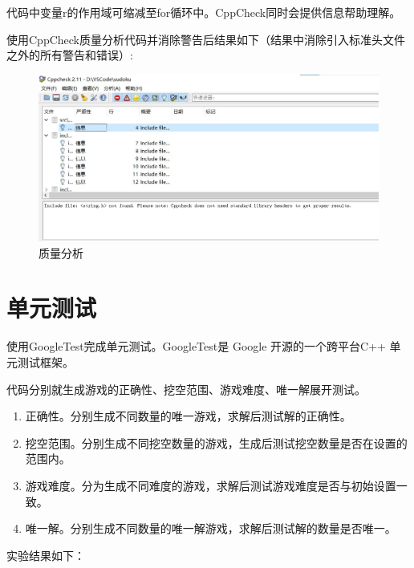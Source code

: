 \documentclass[a4paper]{article}
\begin{document}
代码中变量r的作用域可缩减至for循环中。CppCheck同时会提供信息帮助理解。

使用CppCheck质量分析代码并消除警告后结果如下（结果中消除引入标准头文件之外的所有警告和错误）:
\begin{figure}[!ht]
  \centering
  \includegraphics[scale=0.6]{images/cppcheck.jpg}
  \caption{质量分析}
  \label{fig:cppcheck}
\end{figure}

\section{单元测试}使用GoogleTest完成单元测试。GoogleTest是 Google 开源的一个跨平台C++ 单元测试框架。

代码分别就生成游戏的正确性、挖空范围、游戏难度、唯一解展开测试。
\begin{enumerate}
  \item 正确性。分别生成不同数量的唯一游戏，求解后测试解的正确性。
  \item 挖空范围。分别生成不同挖空数量的游戏，生成后测试挖空数量是否在设置的范围内。
  \item 游戏难度。分为生成不同难度的游戏，求解后测试游戏难度是否与初始设置一致。
  \item 唯一解。分别生成不同数量的唯一解游戏，求解后测试解的数量是否唯一。
\end{enumerate}

实验结果如下：
\end{document}
